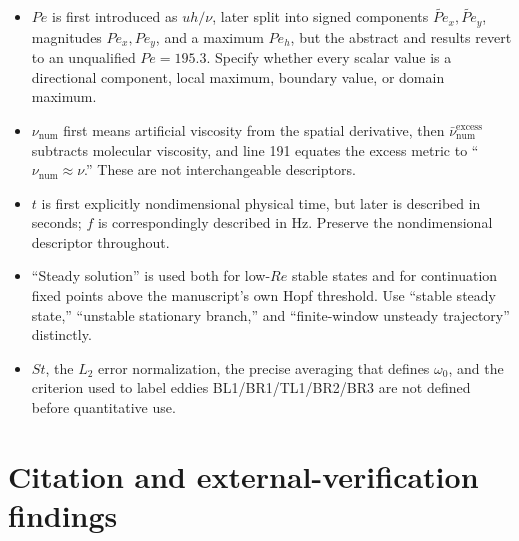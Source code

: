 \documentclass[11pt,a4paper]{article}
\begin{document}
\begin{itemize}
  \item $Pe$ is first introduced as $uh/\nu$, later split into signed components $\widetilde{Pe}_x,\widetilde{Pe}_y$, magnitudes $Pe_x,Pe_y$, and a maximum $Pe_h$, but the abstract and results revert to an unqualified $Pe=195.3$. Specify whether every scalar value is a directional component, local maximum, boundary value, or domain maximum.
  \item $\nu_{\mathrm{num}}$ first means artificial viscosity from the spatial derivative, then $\bar\nu_{\mathrm{num}}^{\mathrm{excess}}$ subtracts molecular viscosity, and line 191 equates the excess metric to ``$\nu_{\mathrm{num}}\approx\nu$.'' These are not interchangeable descriptors.
  \item $t$ is first explicitly nondimensional physical time, but later is described in seconds; $f$ is correspondingly described in Hz. Preserve the nondimensional descriptor throughout.
  \item ``Steady solution'' is used both for low-$Re$ stable states and for continuation fixed points above the manuscript's own Hopf threshold. Use ``stable steady state,'' ``unstable stationary branch,'' and ``finite-window unsteady trajectory'' distinctly.
  \item $St$, the $L_2$ error normalization, the precise averaging that defines $\omega_0$, and the criterion used to label eddies BL1/BR1/TL1/BR2/BR3 are not defined before quantitative use.
\end{itemize}

\section*{Citation and external-verification findings}
\end{document}
